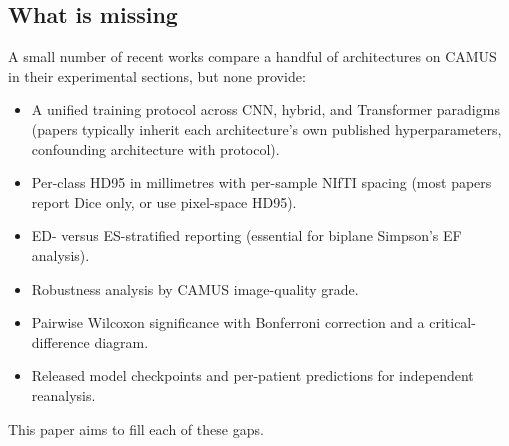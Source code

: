 \subsection{What is missing}
\label{sec:related-gap}

A small number of recent works compare a handful of architectures on
CAMUS in their experimental sections, but none provide:
\begin{itemize}[leftmargin=*,nosep]
\item A unified training protocol across CNN, hybrid, and Transformer
      paradigms (papers typically inherit each architecture's own
      published hyperparameters, confounding architecture with
      protocol).
\item Per-class HD95 in millimetres with per-sample NIfTI spacing
      (most papers report Dice only, or use pixel-space HD95).
\item ED- versus ES-stratified reporting (essential for biplane
      Simpson's EF analysis).
\item Robustness analysis by CAMUS image-quality grade.
\item Pairwise Wilcoxon significance with Bonferroni correction and a
      critical-difference diagram.
\item Released model checkpoints and per-patient predictions for
      independent reanalysis.
\end{itemize}
This paper aims to fill each of these gaps.
